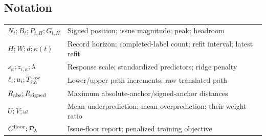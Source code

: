 \subsection{Notation}
\begin{center}\small
\begin{minipage}{\linewidth}
\begin{tabular}{ll}
\toprule
$N_t;B_t;P_{t,H};G_{t,H}$ & Signed position; issue magnitude; peak; headroom\\
$H;W;d;\kappa(t)$ & Record horizon; completed-label count; refit interval; latest refit\\
$s_\kappa;z_{i,\kappa};\lambda$ & Response scale; standardized predictors; ridge penalty\\
$\ell_i;u_i;T^{\rm raw}_{i,h}$ & Lower/upper path increments; raw translated path\\
$R_{\rm abs};R_{\rm signed}$ & Maximum absolute-anchor/signed-anchor distances\\
$U;V;\omega$ & Mean underprediction; mean overprediction; their weight ratio\\
$C^{\rm floor};\mathcal P_\lambda$ & Issue-floor report; penalized training objective\\
\bottomrule
\end{tabular}
\end{minipage}
\end{center}
